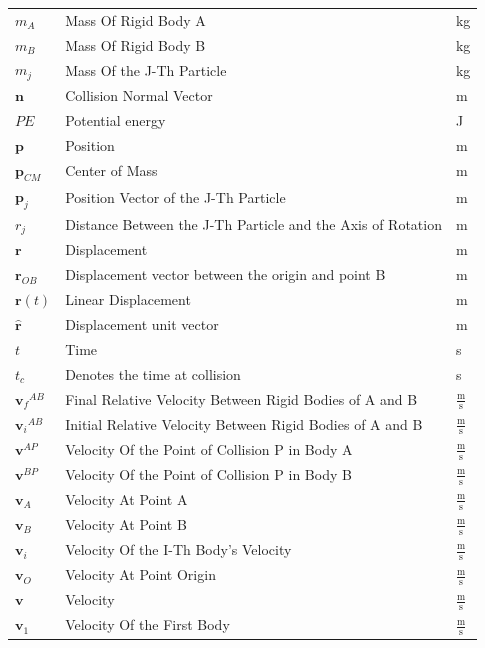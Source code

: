 \documentclass[12pt]{article}
\begin{document}
\begin{longtabu}{l X[l] l}
\\
${m_{A}}$ & Mass Of Rigid Body A & kg
\\
${m_{B}}$ & Mass Of Rigid Body B & kg
\\
${m_{j}}$ & Mass Of the J-Th Particle & kg
\\
$\mathbf{n}$ & Collision Normal Vector & m
\\
$PE$ & Potential energy & J
\\
$\mathbf{p}$ & Position & m
\\
${\mathbf{p}_{CM}}$ & Center of Mass & m
\\
${\mathbf{p}_{j}}$ & Position Vector of the J-Th Particle & m
\\
${r_{j}}$ & Distance Between the J-Th Particle and the Axis of Rotation & m
\\
$\mathbf{r}$ & Displacement & m
\\
${\mathbf{r}_{OB}}$ & Displacement vector between the origin and point B & m
\\
$\mathbf{r}(t)$ & Linear Displacement & m
\\
$\mathbf{\hat{r}}$ & Displacement unit vector & m
\\
$t$ & Time & s
\\
${t_{c}}$ & Denotes the time at collision & s
\\
${{\mathbf{v}_{f}}^{AB}}$ & Final Relative Velocity Between Rigid Bodies of A and B & $\frac{\text{m}}{\text{s}}$
\\
${{\mathbf{v}_{i}}^{AB}}$ & Initial Relative Velocity Between Rigid Bodies of A and B & $\frac{\text{m}}{\text{s}}$
\\
${\mathbf{v}^{AP}}$ & Velocity Of the Point of Collision P in Body A & $\frac{\text{m}}{\text{s}}$
\\
${\mathbf{v}^{BP}}$ & Velocity Of the Point of Collision P in Body B & $\frac{\text{m}}{\text{s}}$
\\
${\mathbf{v}_{A}}$ & Velocity At Point A & $\frac{\text{m}}{\text{s}}$
\\
${\mathbf{v}_{B}}$ & Velocity At Point B & $\frac{\text{m}}{\text{s}}$
\\
${\mathbf{v}_{i}}$ & Velocity Of the I-Th Body's Velocity & $\frac{\text{m}}{\text{s}}$
\\
${\mathbf{v}_{O}}$ & Velocity At Point Origin & $\frac{\text{m}}{\text{s}}$
\\
$\mathbf{v}$ & Velocity & $\frac{\text{m}}{\text{s}}$
\\
${\mathbf{v}_{1}}$ & Velocity Of the First Body & $\frac{\text{m}}{\text{s}}$

\end{longtabu}
\end{document}
